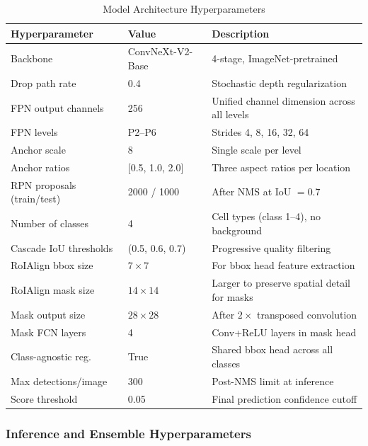 \documentclass[a4paper]{article} %
\begin{document}
\begin{table}[H]
\centering
\caption{Model Architecture Hyperparameters}
\label{tab:model_hyperparams}
\begin{tabular}{lll}
\toprule
\textbf{Hyperparameter} & \textbf{Value} & \textbf{Description} \\
\midrule
Backbone              & ConvNeXt-V2-Base       & 4-stage, ImageNet-pretrained \\
Drop path rate        & 0.4                    & Stochastic depth regularization \\
FPN output channels   & 256                    & Unified channel dimension across all levels \\
FPN levels            & P2--P6                 & Strides 4, 8, 16, 32, 64 \\
Anchor scale          & 8                      & Single scale per level \\
Anchor ratios         & [0.5, 1.0, 2.0]        & Three aspect ratios per location \\
RPN proposals (train/test) & 2000 / 1000       & After NMS at IoU $= 0.7$ \\
Number of classes     & 4                      & Cell types (class 1--4), no background \\
Cascade IoU thresholds & (0.5, 0.6, 0.7)       & Progressive quality filtering \\
RoIAlign bbox size    & $7\times7$             & For bbox head feature extraction \\
RoIAlign mask size    & $14\times14$           & Larger to preserve spatial detail for masks \\
Mask output size      & $28\times28$           & After $2\times$ transposed convolution \\
Mask FCN layers       & 4                      & Conv+ReLU layers in mask head \\
Class-agnostic reg.   & True                   & Shared bbox head across all classes \\
Max detections/image  & 300                    & Post-NMS limit at inference \\
Score threshold       & 0.05                   & Final prediction confidence cutoff \\
\bottomrule
\end{tabular}
\end{table}

\subsubsection{Inference and Ensemble Hyperparameters}
\end{document}
